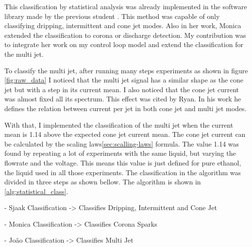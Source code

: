  

This classification by statistical analysis was already implemented in the software library made by the previous student \cite{Monica}.
This method was capable of only classifying dripping, intermittent and cone jet modes. Also in her work, Monica extended the classification to corona or discharge detection.
My contribution was to integrate her work on my control loop model and extend the classification for the multi jet.

To classify the multi jet, after running many steps experiments as shown in figure \ref{fig:raw_data} I noticed that the multi jet signal has a similar shape as the cone jet but with a step in its current mean. 
I also noticed that the cone jet current was almost fixed all its spectrum. 
This effect was cited by Ryan\cite{Ryan}. In his work he defines the relation between current per jet in both cone jet and multi jet modes.

With that, I implemented the classification of the multi jet when the current mean is 1.14 above the expected cone jet current mean. 
The cone jet current can be calculated by the scaling laws\ref{sec:scalling-laws} formula.
The value 1.14 was found by repeating a lot of experiments with the same liquid, but varying the flowrate and the voltage. This means this value is just defined for pure ethanol, the liquid used in all those experiments.
The classification in the algorithm was divided in three steps as shown bellow. The algorithm is shown in \ref{alg:statistical_class}.

        - Sjaak Classification -> Classifies Dripping, Intermittent and Cone Jet
        
        - Monica Classification -> Classifies Corona Sparks

        - João Classification -> Classifies Multi Jet

